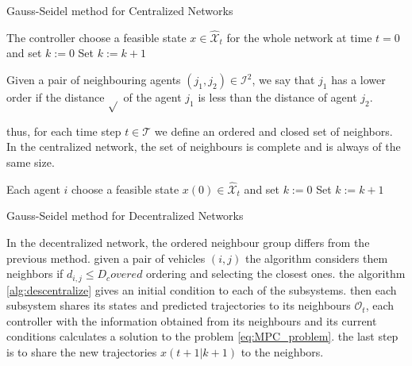 \begin{algorithm}[H]
\caption{Gauss-Seidel method for Centralized Networks}\label{alg:centralize}
 {
\State The controller choose a feasible state $x\in \hat{\mathcal{X}}_t$ for the whole network at time $t=0$ and set $k:=0$
    \State Set $k:=k+1$
    \End
    }
\end{algorithm}




Given a pair of neighbouring agents $(j_1,j_2) \in \mathcal{I}^2$, we say that $j_1$ has a lower order if the distance $\sqrt{}$ of the agent $j_1$ is less than the distance of agent $j_2$.

thus, for each time step $t \in \mathcal{T}$ we define an ordered and closed set of neighbors. In the centralized network, the set of neighbours is complete and is always of the same size.



\begin{algorithm}[H]
 {
\State Each agent $i$ choose a feasible state $x(0) \in \hat{\mathcal{X}}_t$ and set $k:=0$
    \State Set $k:=k+1$
    \End
    }
\caption{Gauss-Seidel method for Decentralized Networks}\label{alg:descentralize}
\end{algorithm}



In the decentralized network, the ordered neighbour group differs from the previous method. given a pair of vehicles $(i,j)$ the algorithm considers them neighbors if $d_{i,j} \leq D_covered$ ordering and selecting the closest ones. the algorithm \ref{alg:descentralize} gives an initial condition to each of the subsystems. then each subsystem shares its states and predicted trajectories to its neighbours $\mathcal{O}_t$, each controller with the information obtained from its neighbours and its current conditions calculates a solution to the problem \ref{eq:MPC_problem}. the last step is to share the new trajectories $x(t+1|k+1)$ to the neighbors.



